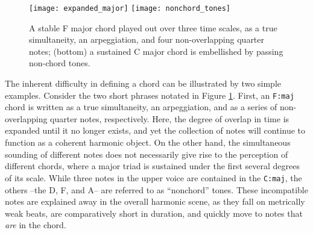 \documentclass{article}
\begin{document}

\begin{figure}[t]
\centering
\texttt{[image: expanded\_major]}
\texttt{[image: nonchord\_tones]}
\caption{A stable F major chord played out over three time scales, as a true simultaneity, an arpeggiation, and four non-overlapping quarter notes; (bottom) a sustained C major chord is embellished by passing non-chord tones.}
\label{fig:harmonic_objects}
\end{figure}

The inherent difficulty in defining a chord can be illustrated by two simple examples.
Consider the two short phrases notated in Figure \ref{fig:harmonic_objects}.
First, an \texttt{F:maj} chord is written as a true simultaneity, an arpeggiation, and as a series of non-overlapping quarter notes, respectively.
Here, the degree of overlap in time is expanded until it no longer exists, and yet the collection of notes will continue to function as a coherent harmonic object.
On the other hand, the simultaneous sounding of different notes does not necessarily give rise to the perception of different chords, where a major triad is sustained under the first several degrees of its scale.
While three notes in the upper voice are contained in the \texttt{C:maj}, the others --the D, F, and A-- are referred to as ``nonchord'' tones.
These incompatible notes are explained away in the overall harmonic scene, as they fall on metrically weak beats, are comparatively short in duration, and quickly move to notes that \emph{are} in the chord.
\end{document}
